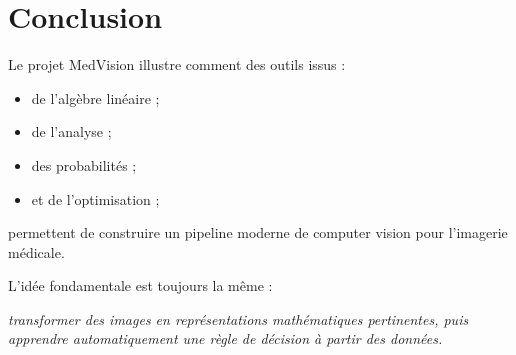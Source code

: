 ﻿\documentclass[11pt,a4paper]{article}
\begin{document}
\section{Conclusion}

Le projet MedVision illustre comment des outils issus :
\begin{itemize}
    \item de l’algèbre linéaire ;
    \item de l’analyse ;
    \item des probabilités ;
    \item et de l’optimisation ;
\end{itemize}
permettent de construire un pipeline moderne de computer vision pour l’imagerie médicale.

L’idée fondamentale est toujours la même :
\begin{center}
\emph{transformer des images en représentations mathématiques pertinentes,
puis apprendre automatiquement une règle de décision à partir des données.}
\end{center}
\end{document}
